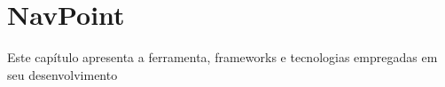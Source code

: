 \chapter{NavPoint}

Este capítulo apresenta a ferramenta, frameworks e tecnologias empregadas em seu desenvolvimento
